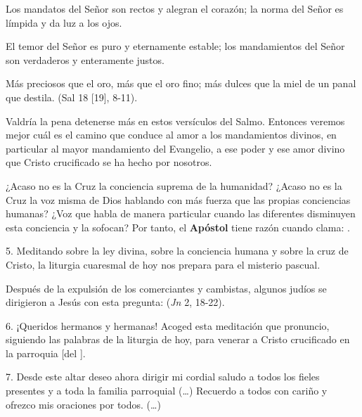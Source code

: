 \begin{body}
\begin{bodyprose}
Los mandatos del Señor son rectos
   y alegran el corazón;
   la norma del Señor es límpida
   y da luz a los ojos.

El temor del Señor es puro
   y eternamente estable;
   los mandamientos del Señor son verdaderos
   y enteramente justos.

Más preciosos que el oro,
   más que el oro fino;
   más dulces que la miel
   de un panal que destila.
(Sal 18 [19], 8-11).
\end{bodyprose}

Valdría la pena detenerse más en estos versículos del Salmo. Entonces veremos mejor cuál es el camino que conduce al amor a los mandamientos divinos, en particular al mayor mandamiento del Evangelio, a ese poder y ese amor divino que Cristo crucificado se ha hecho por nosotros.

¿Acaso no es la Cruz la conciencia suprema de la humanidad? ¿Acaso no es la Cruz la voz misma de Dios hablando con más fuerza que las propias conciencias humanas? ¿Voz que habla de manera particular cuando las diferentes  disminuyen esta conciencia y la sofocan? Por tanto, el \textbf{Apóstol} tiene razón cuando clama: .

5. Meditando sobre la ley divina, sobre la conciencia humana y sobre la cruz de Cristo, la liturgia cuaresmal de hoy nos prepara para el misterio pascual.

Después de la expulsión de los comerciantes y cambistas, algunos judíos se dirigieron a Jesús con esta pregunta:  (\textit{Jn} 2, 18-22).

6. ¡Queridos hermanos y hermanas! Acoged esta meditación que pronuncio, siguiendo las palabras de la liturgia de hoy, para venerar a Cristo crucificado en la parroquia [del ].

7. Desde este altar deseo ahora dirigir mi cordial saludo a todos los fieles presentes y a toda la familia parroquial (\ldots) Recuerdo a todos con cariño y ofrezco mis oraciones por todos. (\ldots) 


\end{body}
